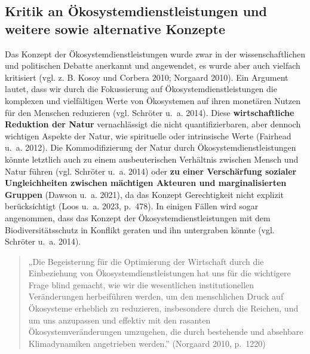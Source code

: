 \documentclass[
  nswissgerman,
  a4paper,
  openany]{book}
\begin{document}
\subsection{Kritik an Ökosystemdienstleistungen und weitere sowie
alternative
Konzepte}\label{kritik-an-uxf6kosystemdienstleistungen-und-weitere-sowie-alternative-konzepte}

Das Konzept der Ökosystemdienstleistungen wurde zwar in der
wissenschaftlichen und politischen Debatte anerkannt und angewendet, es
wurde aber auch vielfach kritisiert (vgl. z. B. Kosoy und Corbera 2010;
Norgaard 2010). Ein Argument lautet, dass wir durch die Fokussierung auf
Ökosystemdienstleistungen die komplexen und vielfältigen Werte von
Ökosystemen auf ihren monetären Nutzen für den Menschen reduzieren (vgl.
{Schröter u.~a.} 2014). Diese \textbf{wirtschaftliche Reduktion der
Natur} vernachlässigt die nicht quantifizierbaren, aber dennoch
wichtigen Aspekte der Natur, wie spirituelle oder intrinsische Werte
(Fairhead u.~a. 2012). Die Kommodifizierung der Natur durch
Ökosystemdienstleistungen könnte letztlich auch zu einem ausbeuterischen
Verhältnis zwischen Mensch und Natur führen (vgl. {Schröter u.~a.} 2014)
oder \textbf{zu einer Verschärfung sozialer Ungleichheiten zwischen
mächtigen Akteuren und marginalisierten Gruppen} (Dawson u.~a. 2021), da
das Konzept Gerechtigkeit nicht explizit berücksichtigt (Loos u.~a.
2023, p.~478). In einigen Fällen wird sogar angenommen, dass das Konzept
der Ökosystemdienstleistungen mit dem Biodiversitätsschutz in Konflikt
geraten und ihn untergraben könnte (vgl. {Schröter u.~a.} 2014).

\begin{quote}
„Die Begeisterung für die Optimierung der Wirtschaft durch die
Einbeziehung von Ökosystemdienstleistungen hat uns für die wichtigere
Frage blind gemacht, wie wir die wesentlichen institutionellen
Veränderungen herbeiführen werden, um den menschlichen Druck auf
Ökosysteme erheblich zu reduzieren, insbesondere durch die Reichen, und
um uns anzupassen und effektiv mit den rasanten Ökosystemveränderungen
umzugehen, die durch bestehende und absehbare Klimadynamiken angetrieben
werden.'' (Norgaard 2010, p.~1220)
\end{quote}
\end{document}
